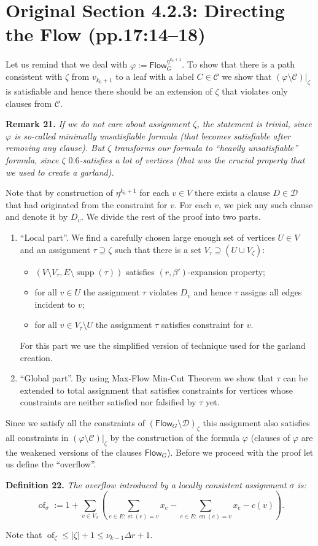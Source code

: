 \documentclass[10pt,a4paper]{article}
\newcommand{\Flow}{\mathsf{Flow}}
\newcommand{\supp}{\operatorname{supp}}
\newcommand{\st}{\operatorname{st}}
\newcommand{\en}{\operatorname{en}}
\newcommand{\of}{\operatorname{of}}
\newenvironment{result}[1]{\par\medskip\noindent\textbf{#1.}\itshape}{\par\medskip}
\begin{document}
\section*{Original Section 4.2.3: Directing the Flow (pp.17:14--18)}
Let us remind that we deal with $\varphi:=\Flow_G^{\eta^{k_0+1}}$. To show that there is a path consistent with $\zeta$ from $v_{k_0+1}$ to a leaf with a label $C\in\mathcal C$ we show that $(\varphi\setminus\mathcal C)|_\zeta$ is satisfiable and hence there should be an extension of $\zeta$ that violates only clauses from $\mathcal C$.
\begin{result}{Remark 21}
If we do not care about assignment $\zeta$, the statement is trivial, since $\varphi$ is so-called minimally unsatisfiable formula (that becomes satisfiable after removing any clause). But $\zeta$ transforms our formula to ``heavily unsatisfiable'' formula, since $\zeta$ $0.6$-satisfies a lot of vertices (that was the crucial property that we used to create a garland).
\end{result}
Note that by construction of $\eta^{k_0+1}$ for each $v\in V$ there exists a clause $D\in\mathcal D$ that had originated from the constraint for $v$. For each $v$, we pick any such clause and denote it by $D_v$. We divide the rest of the proof into two parts.
\begin{enumerate}
\item ``Local part''. We find a carefully chosen large enough set of vertices $U\in V$ and an assignment $\tau\supseteq\zeta$ such that there is a set $V_\tau\supseteq(U\cup V_\zeta)$:
\begin{itemize}\item $(V\setminus V_\tau,E\setminus\supp(\tau))$ satisfies $(r,\beta')$-expansion property;
\item for all $v\in U$ the assignment $\tau$ violates $D_v$ and hence $\tau$ assigns all edges incident to $v$;
\item for all $v\in V_\tau\setminus U$ the assignment $\tau$ satisfies constraint for $v$.\end{itemize}
For this part we use the simplified version of technique used for the garland creation.
\item ``Global part''. By using Max-Flow Min-Cut Theorem we show that $\tau$ can be extended to total assignment that satisfies constraints for vertices whose constraints are neither satisfied nor falsified by $\tau$ yet.
\end{enumerate}
Since we satisfy all the constraints of $(\Flow_G\setminus\mathcal D)_\zeta$ this assignment also satisfies all constraints in $(\varphi\setminus\mathcal C)|_\zeta$ by the construction of the formula $\varphi$ (clauses of $\varphi$ are the weakened versions of the clauses $\Flow_G$).
Before we proceed with the proof let us define the ``overflow''.
\begin{result}{Definition 22}
The overflow introduced by a locally consistent assignment $\sigma$ is:
\[\of_\sigma:=1+\sum_{v\in V_\sigma}\left(\sum_{e\in E:\st(e)=v}x_e-\sum_{e\in E:\en(e)=v}x_e-c(v)\right).\]
\end{result}
Note that $\of_\zeta\le|\zeta|+1\le\nu_{k-1}\Delta r+1$.
\end{document}
